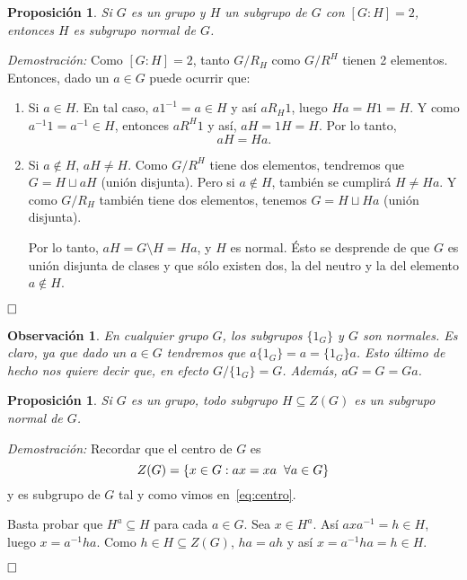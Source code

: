 \documentclass[12pt]{article}
\newtheorem{proposition}[theorem]{Proposición}
\newtheorem{observation}{Observación}[theorem]
\begin{document}
\begin{proposition}Si $G$ es un grupo y $H$ un subgrupo de $G$ con $\left[ G:H \right] = 2$, entonces $H$ es subgrupo normal de $G$.
\end{proposition}
\emph{Demostración: }Como $\left[ G:H \right] = 2$, tanto $G/R_{H}$ como $G/R^{H}$ tienen 2 elementos. Entonces, dado un $a \in G$ puede ocurrir que:\begin{enumerate}
\item Si $a \in H$. En tal caso, $a1^{-1} = a \in H$ y así $aR_{H}1$, luego $Ha = H1 = H.$ Y como $a^{-1}1 = a^{-1} \in H$, entonces $aR^{H}1$ y así, $aH = 1H = H.$ Por lo tanto, $$aH = Ha.$$
\item Si $a \notin H$, $aH \neq H$. Como $G/R^{H}$ tiene dos elementos, tendremos que $G = H\sqcup aH$ (unión disjunta).
Pero si $a \notin H$, también se cumplirá $H \neq Ha$. Y como $G/R_{H}$ también tiene dos elementos, tenemos $ G = H \sqcup Ha$ (unión disjunta).

Por lo tanto, $aH = G\setminus H = Ha$, y $H$ es normal. Ésto se desprende de que $G$ es unión disjunta de clases y que sólo existen dos, la del neutro y la del elemento $a \notin H$.
\end{enumerate}
$\hfill \square$

\begin{observation} En cualquier grupo $G$, los subgrupos $\lbrace 1_{G} \rbrace$ y $G$ son normales. Es claro, ya que dado un $a \in G$ tendremos que $a \lbrace 1_{G} \rbrace = a = \lbrace 1_{G} \rbrace a$. Esto último de hecho nos quiere decir que, en efecto $G/\lbrace 1_{G} \rbrace = G$. Además, $aG = G = Ga$.
\end{observation}

\begin{proposition}Si $G$ es un grupo, todo subgrupo $H \subseteq Z(G)$ es un subgrupo normal de $G$.
\end{proposition}
\emph{Demostración: } Recordar que el centro de $G$ es $$Z(G) = \lbrace x \in G : ax = xa \hspace{0.2cm} \forall a \in G\rbrace$$ y es subgrupo de $G$ tal y como vimos en~\ref{eq:centro}.

Basta probar que $H^{a}\subseteq H$ para cada $a \in G$. Sea $x \in H^{a}$. Así $axa^{-1} = h \in H$, luego $x = a^{-1}ha$. Como $h \in H \subseteq Z(G)$, $ha = ah$ y así $x = a^{-1}ha = h \in H.$

$\hfill \square$
\end{document}
